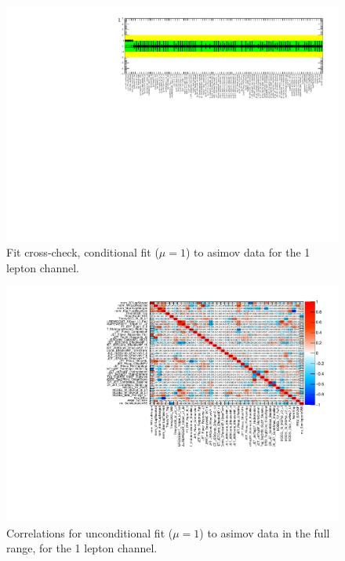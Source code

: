 

\begin{figure}[ht]
      \centering
        \includegraphics[width=\linewidth]{figures/Fit_fcc/AsimovFit/NP_allExceptGammas.pdf}
        \caption{Fit cross-check, conditional fit ($\mu=1$) to asimov data for the 1 lepton channel.}
       \label{fig:fit_1lep_fcc_asimov}
\end{figure}

\begin{figure}[ht]
      \centering
        \includegraphics[width=\linewidth]{figures/Fit_fcc/AsimovFit_uncon/corr_HighCorrNoMCStat.pdf}
        \caption{Correlations for unconditional fit ($\mu=1$) to asimov data in the full range, for the 1 lepton channel.}
       \label{fig:fit_1lep_corr_all}
\end{figure}

